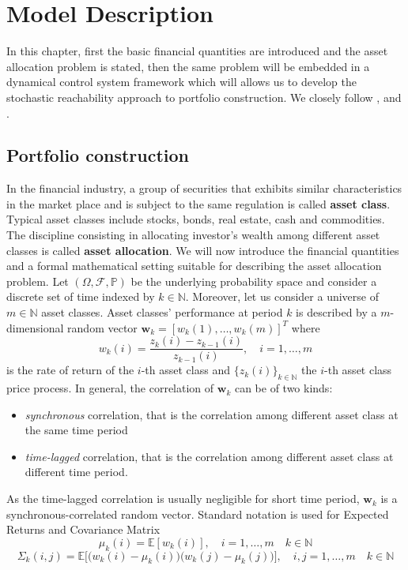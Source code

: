 \chapter{Model Description}\label{chpt:Model_Description}
In this chapter, first the basic financial quantities are introduced and the asset allocation problem is stated, then the same problem will be embedded in a dynamical control system framework which will allows us to develop the stochastic reachability approach to portfolio construction. We closely follow \cite{Pola12},\cite{Pola06} and \cite{Pola}.
\section{Portfolio construction}
In the financial industry, a group of securities that exhibits similar characteristics in the market place and is subject to the same regulation is called \textbf{asset class}. Typical asset classes include stocks, bonds, real estate, cash and commodities. The discipline consisting in allocating investor's wealth among different asset classes is called \textbf{asset allocation}. We will now introduce the financial quantities and a formal mathematical setting suitable for describing the asset allocation problem. Let $(\Omega,\mathcal{F},\mathbb{P})$ be the underlying  probability space and consider a discrete set of time indexed by $k \in \mathbb{N}$. Moreover, let us consider a universe of $m \in \mathbb{N}$ asset classes. Asset classes' performance at period $k$ is described by a $m$-dimensional random vector $\bm{w}_k = [w_k(1),\ldots,w_k(m)]^T$ where $$ w_k(i) = \frac{z_k(i)-z_{k-1}(i)}{z_{k-1}(i)}, \quad i = 1,\ldots,m$$
is the rate of return of the $i$-th asset class and $\{z_k(i)\}_{k \in \mathbb{N}}$ the $i$-th asset class price process. In general, the correlation of $\bm{w}_k$ can be of two kinds:
\begin{itemize}
	\item \textit{synchronous} correlation, that is the correlation among different asset class at the same time period
	\item \textit{time-lagged} correlation, that is the correlation among different asset class at different time period.
\end{itemize}
As the time-lagged correlation is usually negligible for short time period, $\bm{w}_k$ is a synchronous-correlated random vector. Standard notation is used for Expected Returns and Covariance Matrix $$\mu_k(i) = \mathbb{E}[w_k(i)], \quad i = 1,\ldots,m \quad k \in \mathbb{N}$$
 $$\Sigma_k(i,j) = \mathbb{E}\Big[\big(w_k(i)-\mu_k(i)\big)\big(w_k(j)-\mu_k(j)\big)\Big], \quad i,j = 1,\ldots,m \quad k \in \mathbb{N}$$
